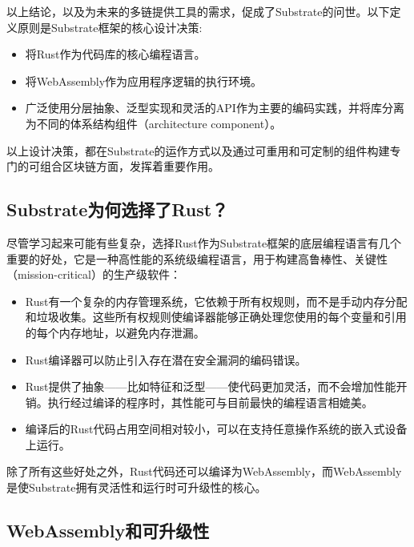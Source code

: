 以上结论，以及为未来的多链提供工具的需求，促成了Substrate的问世。以下定义原则是Substrate框架的核心设计决策:

\begin{itemize}
\item
  将Rust作为代码库的核心编程语言。
\item
  将WebAssembly作为应用程序逻辑的执行环境。
\item
  广泛使用分层抽象、泛型实现和灵活的API作为主要的编码实践，并将库分离为不同的体系结构组件（architecture
  component）。
\end{itemize}

以上设计决策，都在Substrate的运作方式以及通过可重用和可定制的组件构建专门的可组合区块链方面，发挥着重要作用。

\hypertarget{substrateux4e3aux4f55ux9009ux62e9ux4e86rust}{%
\subsection{Substrate为何选择了Rust？}\label{substrateux4e3aux4f55ux9009ux62e9ux4e86rust}}

尽管学习起来可能有些复杂，选择Rust作为Substrate框架的底层编程语言有几个重要的好处，它是一种高性能的系统级编程语言，用于构建高鲁棒性、关键性（mission-critical）的生产级软件：

\begin{itemize}
\item
  Rust有一个复杂的内存管理系统，它依赖于所有权规则，而不是手动内存分配和垃圾收集。这些所有权规则使编译器能够正确处理您使用的每个变量和引用的每个内存地址，以避免内存泄漏。
\item
  Rust编译器可以防止引入存在潜在安全漏洞的编码错误。
\item
  Rust提供了抽象------比如特征和泛型------使代码更加灵活，而不会增加性能开销。执行经过编译的程序时，其性能可与目前最快的编程语言相媲美。
\item
  编译后的Rust代码占用空间相对较小，可以在支持任意操作系统的嵌入式设备上运行。
\end{itemize}

除了所有这些好处之外，Rust代码还可以编译为WebAssembly，而WebAssembly是使Substrate拥有灵活性和运行时可升级性的核心。

\hypertarget{webassemblyux548cux53efux5347ux7ea7ux6027}{%
\subsection{WebAssembly和可升级性}\label{webassemblyux548cux53efux5347ux7ea7ux6027}}

